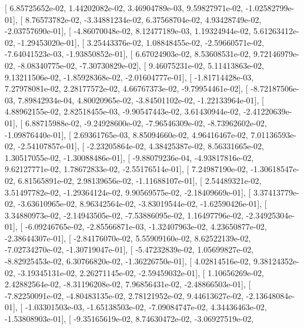 \documentclass{article}
\begin{document}
       [  6.85725652e-02,   1.44202082e-02,   3.46904789e-03,
          9.59827971e-02,  -1.02582799e-01],
       [  8.76573782e-02,  -3.34881234e-02,   6.37568704e-02,
          4.93428749e-02,  -2.03757690e-01],
       [ -4.86070048e-02,   8.12477189e-03,   1.19324944e-02,
          5.61263412e-02,  -1.29453020e-01],
       [  3.25443376e-02,   1.08848455e-02,  -2.59660571e-02,
         -7.64041523e-03,  -1.93850852e-01],
       [  6.67024903e-02,   8.53608531e-02,   9.72146979e-02,
         -8.08340775e-02,  -7.30730829e-02],
       [  9.46075231e-02,   5.11413863e-02,   9.13211506e-02,
         -1.85928368e-02,  -2.01604777e-01],
       [ -1.81714428e-03,   7.27978081e-02,   2.28177572e-02,
          4.66767373e-02,  -9.79954461e-02],
       [ -8.72187506e-03,   7.89842934e-04,   4.80020965e-02,
         -3.84501102e-02,  -1.22133964e-01],
       [  4.88962155e-02,   2.82518455e-03,  -9.90547443e-02,
          3.61430944e-02,  -2.41220639e-01],
       [  6.88715988e-02,  -9.24928600e-02,  -7.96546309e-02,
         -8.73962602e-02,  -1.09876440e-01],
       [  2.69361765e-03,   8.85094660e-02,   4.96416467e-02,
          7.01136593e-02,  -2.54107857e-01],
       [ -2.23205864e-02,   4.38425387e-02,   8.56331665e-02,
          1.30517055e-02,  -1.30088486e-01],
       [ -9.88079236e-04,  -4.93817816e-02,   9.62127771e-02,
          1.78672833e-02,  -2.55176514e-01],
       [  7.24987190e-02,  -1.30618547e-02,   6.81565891e-02,
          2.98139656e-02,  -1.11688107e-01],
       [  2.54489321e-02,   3.51497782e-02,  -1.29364124e-02,
          9.90569575e-02,  -2.18409669e-01],
       [  3.37413779e-02,  -3.63610965e-02,   8.96342564e-02,
         -3.83019544e-02,  -1.62590426e-01],
       [  3.34880973e-02,  -2.14943505e-02,  -7.53886095e-02,
          1.16497796e-02,  -2.34925304e-01],
       [ -6.09246765e-02,  -2.85566871e-03,  -1.32407963e-02,
          4.23650877e-02,  -2.38644307e-01],
       [ -2.84176070e-02,   5.55909160e-02,   8.62522139e-02,
         -7.02734270e-02,  -1.30719047e-01],
       [ -5.47232839e-02,   1.05699827e-02,  -8.82925453e-02,
          6.30766820e-02,  -1.36226750e-01],
       [  4.02814516e-02,   9.38124352e-02,  -3.19345131e-02,
          2.26271145e-02,  -2.59459032e-01],
       [  1.10656269e-02,   2.42882564e-02,  -8.31196208e-02,
          7.96856431e-02,  -2.48866503e-01],
       [ -7.82250091e-02,  -4.80483135e-02,   2.78121952e-02,
          9.44613627e-02,  -2.13648084e-01],
       [ -1.03301503e-03,  -1.65138503e-02,  -7.09084747e-02,
          4.34436463e-02,  -1.53808903e-01],
       [ -9.35165619e-02,   8.74630472e-02,  -3.06927519e-02,
\end{document}
